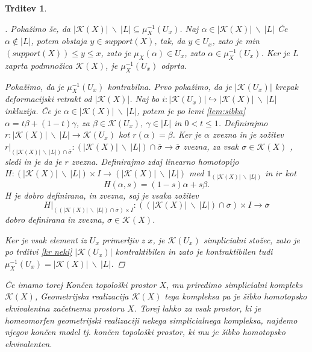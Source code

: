 \documentclass[a4paper,12pt]{article}
\DeclareRobustCommand{\k}{
    \mathcal{K}
}
\theoremstyle{definition}
\theoremstyle{plain}
\theoremstyle{definition}
\theoremstyle{plain}
\newtheorem{trditev}{Trditev}
\theoremstyle{plain}
\theoremstyle{plain}
\theoremstyle{plain}
\newenvironment{dokaz}{\begin{proof}[\bfseries\upshape\proofname]}{\end{proof}}
\begin{document}
\begin{trditev}
\begin{dokaz}
    Pokažimo še, da $|\mathcal{K}(X)|\ \backslash \
    |L|\subseteq \mu_X^{-1}(U_x)$. Naj $\alpha \in |\mathcal{K}(X)|\ \backslash \ |L|$
    Če  $\alpha \notin |L|$, potem obstaja $y\in 
    \textit{support}(X)$, tak, da $y \in U_x$, zato je 
    min$(\textit{support}(X))\leq y \leq x$, zato je 
    $\mu_X(\alpha) \in U_x$, zato $\alpha \in \mu_X^{-1}
    (U_x)$.
    Ker je $L$ zaprta podmnožica $\mathcal{K}(X)$, je 
    $\mu_X^{-1}(U_x)$ odprta.

    Pokažimo, da je $\mu_X^{-1}(U_x)$ kontrabilna. Prvo pokažimo, da je 
    $|\mathcal{K}(U_x)|$ krepak deformacijski retrakt 
    od $|\mathcal{K}(X)|$. Naj bo $i:|\k(U_x)|\hookrightarrow |\mathcal{K}
    (X)|\ \backslash \ |L|$ inkluzija. Če je $\alpha \in |\mathcal{K}(X)|\ 
    \backslash \ |L|$, potem je po lemi \ref{lem:sibka}  $\alpha = t\beta + 
    (1-t)\gamma$, za $\beta \in \k(U_x), \ \gamma \in |L|$ in $0<t\leq 1$. 
    Definirajmo $r:|\mathcal{K}(X)|\ \backslash \ |L|\rightarrow \k(U_x)$ 
    kot $r(\alpha)=\beta$. Ker je $\alpha$ zvezna in je zožitev $r|_{(|\mathcal{K}(X)|\ \backslash \ |L|)\cap 
    \overline{\sigma}}:(|\mathcal{K}(X)|\ \backslash \ |L|)\cap 
    \overline{\sigma} \rightarrow \overline{\sigma}$ zvezna, za vsak 
    $\sigma \in \k(X)$ , sledi in je da je $r$ zvezna. Definirajmo zdaj linearno homotopijo $H:(|\mathcal{K}(X)|\ \backslash \ |L|) \times I \rightarrow (|\mathcal{K}(X)|\ \backslash \ |L|)$ med $1_{(|\mathcal{K}(X)|\ \backslash \ |L|)}$ in $ir$ kot 
    $$
    H(\alpha,s)=(1-s)\alpha + s\beta.
    $$
    H je dobro definirana, in zvezna, saj je vsaka zožitev 
    $$
    H|_{((|\mathcal{K}(X)|\ \backslash \ |L|)\cap 
    \overline{\sigma})\times I}:((|\mathcal{K}(X)|\ \backslash \ |L|)\cap 
    \overline{\sigma})\times I \rightarrow \overline{\sigma}
    $$
    dobro definirana in zvezna, $\sigma \in \k(X)$.

    Ker je vsak element iz $U_x$ primerljiv z $x$, je $\k(U_x)$ 
    simplicialni stožec, zato je po trditvi \ref{kr neki} $|\k(U_x)|$ 
    kontraktibilen in zato je kontraktibilen tudi $\mu_X^{-1}
    (U_x)=|\mathcal{K}(X)|\ \backslash \ |L|$.
\end{dokaz}


Če imamo torej Končen topološki prostor $X$, mu priredimo simplicialni kompleks
$\k(X)$, Geometrijska realizacija $\k(X)$ tega kompleksa pa je šibko homotopsko ekvivalentna 
začetnemu prostoru $X$. Torej lahko za vsak prostor, ki je homeomorfen geometrijski realizaciji
nekega simplicialnega kompleksa, najdemo njegov končen model tj. končen topološki prostor, ki mu
je šibko homotopsko ekvivalenten.


\end{trditev}
\end{document}
